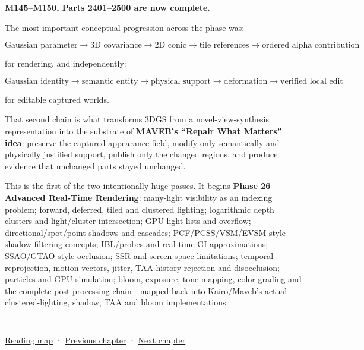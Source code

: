 \textbf{M145--M150, Parts 2401--2500 are now complete.}

The most important conceptual progression across the phase was:

\[
\boxed{
\text{Gaussian parameter}
\rightarrow
\text{3D covariance}
\rightarrow
\text{2D conic}
\rightarrow
\text{tile references}
\rightarrow
\text{ordered alpha contribution}
}
\]

for rendering, and independently:

\[
\boxed{
\text{Gaussian identity}
\rightarrow
\text{semantic entity}
\rightarrow
\text{physical support}
\rightarrow
\text{deformation}
\rightarrow
\text{verified local edit}
}
\]

for editable captured worlds.

That second chain is what transforms 3DGS from a novel-view-synthesis representation into the substrate of \textbf{MAVEB's ``Repair What Matters'' idea}: preserve the captured appearance field, modify only semantically and physically justified support, publish only the changed regions, and produce evidence that unchanged parts stayed unchanged.

This is the first of the two intentionally huge passes. It begins \textbf{Phase 26 --- Advanced Real-Time Rendering}: many-light visibility as an indexing problem; forward, deferred, tiled and clustered lighting; logarithmic depth clusters and light/cluster intersection; GPU light lists and overflow; directional/spot/point shadows and cascades; PCF/PCSS/VSM/EVSM-style shadow filtering concepts; IBL/probes and real-time GI approximations; SSAO/GTAO-style occlusion; SSR and screen-space limitations; temporal reprojection, motion vectors, jitter, TAA history rejection and disocclusion; particles and GPU simulation; bloom, exposure, tone mapping, color grading and the complete post-processing chain---mapped back into Kairo/Maveb's actual clustered-lighting, shadow, TAA and bloom implementations.

\begin{center}\rule{0.5\linewidth}{0.5pt}\end{center}

\begin{center}\rule{0.5\linewidth}{0.5pt}\end{center}

\hyperref[volume-reading-map]{Reading map} · \hyperref[06-engine-ii-ch044-cross-backend-conversion-and-agreement]{Previous chapter} · \hyperref[06-engine-ii-ch046-game-design-from-mechanics-to-narrative-interfaces]{Next chapter}
